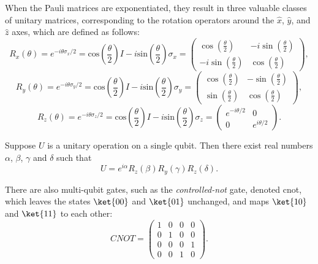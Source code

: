 When the Pauli matrices are exponentiated, they result in three valuable classes of unitary matrices, corresponding to the rotation operators around the $\hat{x}$, $\hat{y}$, and $\hat{z}$ axes, which are defined as follows:
\begin{equation*}
  R_{x}(\theta) = e^{-i\theta \sigma_{x}/2} = \text{cos} \left(\frac{\theta}{2} \right) I -i \text{sin} \left(\frac{\theta}{2} \right) \sigma_{x} = \begin{pmatrix} \cos(\frac{\theta}{2}) & -i\sin(\frac{\theta}{2})\\ -i\sin(\frac{\theta}{2}) & \cos(\frac{\theta}{2}) \end{pmatrix},
\end{equation*}
\begin{equation*}
  R_{y}(\theta) = e^{-i\theta \sigma_{y}/2} = \text{cos} \left(\frac{\theta}{2} \right) I -i \text{sin} \left(\frac{\theta}{2} \right) \sigma_{y} = \begin{pmatrix} \cos(\frac{\theta}{2}) & -\sin(\frac{\theta}{2})\\ \sin(\frac{\theta}{2}) & \cos(\frac{\theta}{2}) \end{pmatrix},
\end{equation*}
\begin{equation*}
  R_{z}(\theta) = e^{-i\theta \sigma_{z}/2} = \text{cos} \left(\frac{\theta}{2} \right) I -i \text{sin} \left(\frac{\theta}{2} \right) \sigma_{z} = \begin{pmatrix} e^{-i\theta/2} & 0\\ 0 & e^{i\theta/2} \end{pmatrix}.
\end{equation*}

\begin{theorem} \label{unitary} \cite{nielsen2010quantum}
  Suppose $U$ is a unitary operation on a single qubit. Then there exist real numbers $\alpha$, $\beta$, $\gamma$ and $\delta$ such that
  \begin{equation*}
    U = e^{i\alpha} R_{z}(\beta) R_{y}(\gamma) R_{z}(\delta).
  \end{equation*}
\end{theorem}

There are also multi-qubit gates, such as the \emph{controlled-not} gate, denoted \gls{cnot}, which leaves the states $\ket{00}$ and  $\ket{01}$ unchanged, and maps $\ket{10}$ and $\ket{11}$ to each other:
\begin{equation*}
  \textit{CNOT} = \begin{pmatrix} 1 & 0 & 0 & 0\\ 0 & 1 & 0 & 0\\ 0 & 0 & 0 & 1\\ 0 & 0 & 1 & 0 \end{pmatrix}.
\end{equation*}

